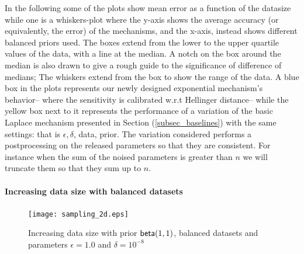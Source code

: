 \documentclass{article}
\begin{document}
\noindent In the following some of the plots show
mean error as a function of the datasize while one
is a whiskers-plot where the y-axis shows the average
accuracy (or equivalently, the error) of the mechanisms, and the x-axis, instead shows
different balanced priors used. The boxes extend from the lower to the upper quartile values
of the data, with a line at the median. A notch on the box around the
median is also drawn to give a rough guide to the significance of
difference of medians; The whiskers extend from the box to show the
range of the data. A blue box in the plots represents our newly
designed exponential mechanism's behavior-- where the sensitivity is calibrated
w.r.t Hellinger distance-- while the yellow box next to
it represents the performance of a variation of the basic Laplace
mechanism presented in Section (\ref{subsec_baselines}) with the same
settings: that is $\epsilon, \delta$, data, prior. The variation
considered performs a postprocessing on the released parameters so
that they are consistent. For instance when the sum of the noised
parameters is greater than $n$ we will truncate them so that they sum
up to $n$.

\paragraph{Increasing data size with balanced datasets}
\label{subsubsec_vs_datasize}

\begin{figure}
\begin{center}
\centering
    \texttt{[image: sampling\_2d.eps]}
\caption{Increasing data size with prior $\mathsf{beta}(1,1)$, balanced datasets and parameters $\epsilon = 1.0$ and $\delta = 10^{-8}$}
\label{fig_vs_datasize_2d}
\end{center}
\end{figure}

\begin{figure}[ht]
\begin{center}
\centering
{}
\end{center}
\end{figure}
\end{document}

